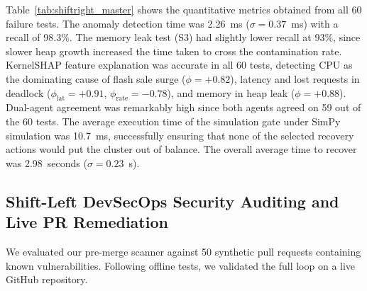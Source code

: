 \documentclass[10pt,conference]{IEEEtran}
\begin{document}
Table~\ref{tab:shiftright_master} shows the quantitative metrics obtained from all 60 failure tests. The anomaly detection time was 2.26~ms ($\sigma=0.37$~ms) with a recall of 98.3\%. The memory leak test (S3) had slightly lower recall at 93\%, since slower heap growth increased the time taken to cross the contamination rate. KernelSHAP feature explanation was accurate in all 60 tests, detecting CPU as the dominating cause of flash sale surge ($\phi=+0.82$), latency and lost requests in deadlock ($\phi_{\text{lat}}=+0.91$, $\phi_{\text{rate}}=-0.78$), and memory in heap leak ($\phi=+0.88$). Dual-agent agreement was remarkably high since both agents agreed on 59 out of the 60 tests. The average execution time of the simulation gate under SimPy simulation was 10.7~ms, successfully ensuring that none of the selected recovery actions would put the cluster out of balance. The overall average time to recover was 2.98~seconds ($\sigma=0.23$~s).

\subsection{Shift-Left DevSecOps Security Auditing and Live PR Remediation}

We evaluated our pre-merge scanner against 50 synthetic pull requests containing known vulnerabilities. Following offline tests, we validated the full loop on a live GitHub repository.
\end{document}

